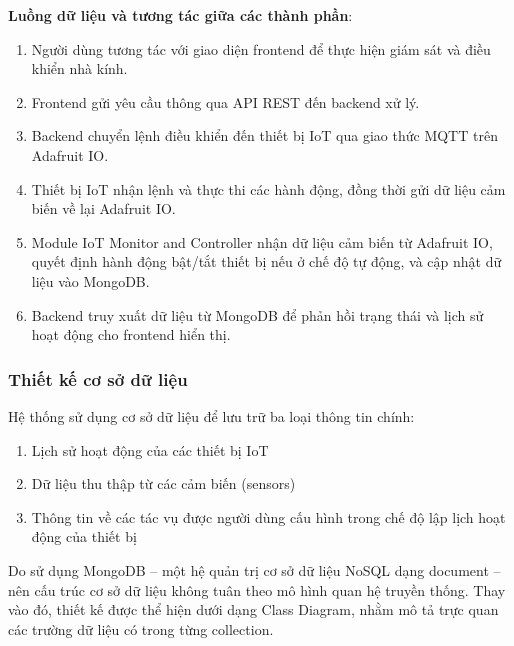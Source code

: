 \textbf{Luồng dữ liệu và tương tác giữa các thành phần}:
\begin{enumerate}
    \item Người dùng tương tác với giao diện frontend để thực hiện giám sát và điều khiển nhà kính.
    \item Frontend gửi yêu cầu thông qua API REST đến backend xử lý.
    \item Backend chuyển lệnh điều khiển đến thiết bị IoT qua giao thức MQTT trên Adafruit IO.
    \item Thiết bị IoT nhận lệnh và thực thi các hành động, đồng thời gửi dữ liệu cảm biến về lại Adafruit IO.
    \item Module IoT Monitor and Controller nhận dữ liệu cảm biến từ Adafruit IO, quyết định hành động bật/tắt thiết bị nếu ở chế độ tự động, và cập nhật dữ liệu vào MongoDB.
    \item Backend truy xuất dữ liệu từ MongoDB để phản hồi trạng thái và lịch sử hoạt động cho frontend hiển thị.
\end{enumerate}

\subsubsection{Thiết kế cơ sở dữ liệu}

Hệ thống sử dụng cơ sở dữ liệu để lưu trữ ba loại thông tin chính:
\begin{enumerate}
    \item Lịch sử hoạt động của các thiết bị IoT
    \item Dữ liệu thu thập từ các cảm biến (sensors)
    \item Thông tin về các tác vụ được người dùng cấu hình trong chế độ lập lịch hoạt động của thiết bị
\end{enumerate}

Do sử dụng MongoDB – một hệ quản trị cơ sở dữ liệu NoSQL dạng document – nên cấu trúc cơ sở dữ liệu không tuân theo mô hình quan hệ truyền thống. Thay vào đó, thiết kế được thể hiện dưới dạng Class Diagram, nhằm mô tả trực quan các trường dữ liệu có trong từng collection.

